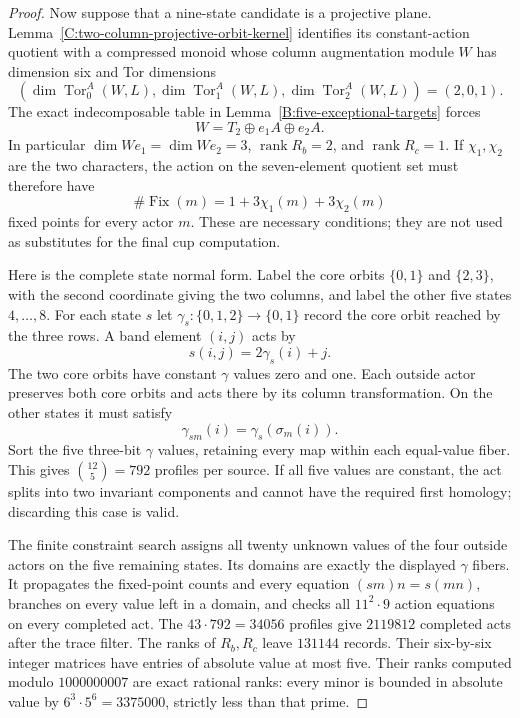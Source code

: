 \begin{proof}
Now suppose that a nine-state candidate is a projective plane.
Lemma~\ref{C:two-column-projective-orbit-kernel} identifies its
constant-action quotient with a compressed monoid whose column
augmentation module $W$ has dimension six and Tor dimensions
\[
 (\dim\operatorname{Tor}_0^A(W,L),
   \dim\operatorname{Tor}_1^A(W,L),
   \dim\operatorname{Tor}_2^A(W,L))=(2,0,1).
\]
The exact indecomposable table in
Lemma~\ref{B:five-exceptional-targets} forces
\[
 W=T_2\oplus e_1A\oplus e_2A.
\]
In particular $\dim We_1=\dim We_2=3$,
$\operatorname{rank}R_b=2$, and
$\operatorname{rank}R_c=1$.  If $\chi_1,\chi_2$ are the two
characters, the action on the seven-element quotient set must
therefore have
\[
 \#\operatorname{Fix}(m)=1+3\chi_1(m)+3\chi_2(m)
\]
fixed points for every actor $m$.  These are necessary conditions;
they are not used as substitutes for the final cup computation.

Here is the complete state normal form.  Label the core orbits
$\{0,1\}$ and $\{2,3\}$, with the second coordinate giving
the two columns, and label the other five states $4,\ldots,8$.
For each state $s$ let
$\gamma_s:\{0,1,2\}\to\{0,1\}$ record the core orbit reached
by the three rows.  A band element $(i,j)$ acts by
\[
 s(i,j)=2\gamma_s(i)+j.
\]
The two core orbits have constant $\gamma$ values zero and one.
Each outside actor preserves both core orbits and acts there by
its column transformation.  On the other states it must satisfy
\[
 \gamma_{sm}(i)=\gamma_s(\sigma_m(i)).
\]
Sort the five three-bit $\gamma$ values, retaining every map
within each equal-value fiber.  This gives $\binom{12}{5}=792$
profiles per source.  If all five values are constant, the act
splits into two invariant components and cannot have the required
first homology; discarding this case is valid.

The finite constraint search
 assigns all twenty
unknown values of the four outside actors on the five remaining
states.  Its domains are exactly the displayed $\gamma$ fibers.
It propagates the fixed-point counts and every equation
$(sm)n=s(mn)$, branches on every value left in a domain, and
checks all $11^2\cdot9$ action equations on every completed act.
The $43\cdot792=34056$ profiles give $2119812$ completed acts
after the trace filter.  The ranks of $R_b,R_c$ leave $131144$
records.  Their six-by-six integer matrices have entries of
absolute value at most five.  Their ranks computed modulo
$1000000007$ are exact rational ranks: every minor is bounded
in absolute value by
$6^3\cdot5^6=3375000$, strictly less than that prime.


\end{proof}
